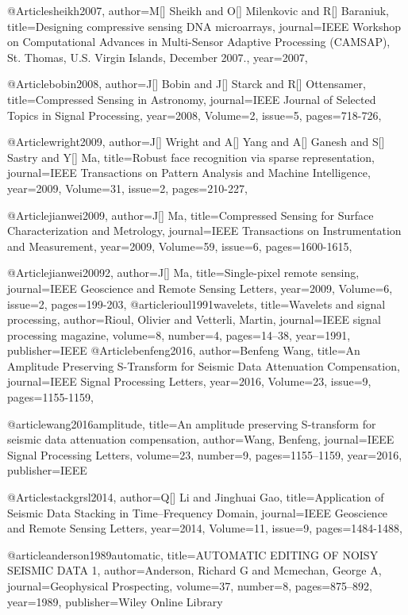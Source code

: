 @Article{sheikh2007,
  author={M[] Sheikh and O[] Milenkovic and R[] Baraniuk},
  title={Designing compressive sensing DNA microarrays},
  journal={IEEE Workshop on Computational Advances in Multi-Sensor Adaptive
Processing (CAMSAP), St. Thomas, U.S. Virgin Islands, December 2007.},
  year=2007,
}

@Article{bobin2008,
  author={J[] Bobin and J[] Starck and R[] Ottensamer},
  title={Compressed Sensing in Astronomy},
  journal={IEEE Journal of Selected Topics in Signal Processing},
  year=2008,
  Volume=2,
  issue=5,
  pages={718-726},
}

@Article{wright2009,
  author={J[] Wright and A[] Yang and A[] Ganesh and S[] Sastry and Y[] Ma},
  title={Robust face recognition via sparse representation},
  journal={IEEE Transactions on Pattern Analysis and Machine Intelligence},
  year=2009,
  Volume=31,
  issue=2,
  pages={210-227},
}

@Article{jianwei2009,
  author={J[] Ma},
  title={Compressed Sensing for Surface Characterization and Metrology},
  journal={IEEE Transactions on Instrumentation and Measurement},
  year=2009,
  Volume=59,
  issue=6,
  pages={1600-1615},
}

@Article{jianwei20092,
  author={J[] Ma},
  title={Single-pixel remote sensing},
  journal={IEEE Geoscience and Remote Sensing Letters},
  year=2009,
  Volume=6,
  issue=2,
  pages={199-203},
}
@article{rioul1991wavelets,
  title={Wavelets and signal processing},
  author={Rioul, Olivier and Vetterli, Martin},
  journal={IEEE signal processing magazine},
  volume={8},
  number={4},
  pages={14--38},
  year={1991},
  publisher={IEEE}
}
@Article{benfeng2016,
  author={Benfeng Wang},
  title={An Amplitude Preserving S-Transform for Seismic Data Attenuation Compensation},
  journal={IEEE Signal Processing Letters},
  year=2016,
  Volume=23,
  issue=9,
  pages={1155-1159},
}

@article{wang2016amplitude,
  title={An amplitude preserving S-transform for seismic data attenuation compensation},
  author={Wang, Benfeng},
  journal={IEEE Signal Processing Letters},
  volume={23},
  number={9},
  pages={1155--1159},
  year={2016},
  publisher={IEEE}
}

 @Article{stackgrsl2014,
  author={Q[] Li and Jinghuai Gao},
  title={Application of Seismic Data Stacking in Time–Frequency Domain},
  journal={IEEE Geoscience and Remote Sensing Letters},
  year=2014,
  Volume=11,
  issue=9,
  pages={1484-1488},
}

@article{anderson1989automatic,
  title={AUTOMATIC EDITING OF NOISY SEISMIC DATA 1},
  author={Anderson, Richard G and Mcmechan, George A},
  journal={Geophysical Prospecting},
  volume={37},
  number={8},
  pages={875--892},
  year={1989},
  publisher={Wiley Online Library}
}

